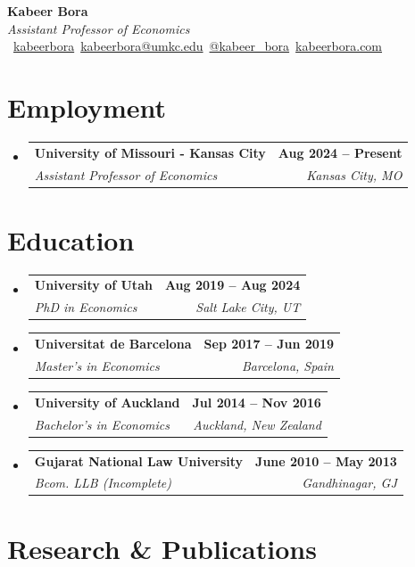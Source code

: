 \documentclass[letterpaper,11pt]{article}
\makeatletter
\newcommand{\resumeSubheading}[4]{
  \vspace{-1pt}\item
    \begin{tabular*}{1.0\textwidth}[t]{l@{\extracolsep{\fill}}r}
      \textbf{\color{primarycolor}#1} & \textbf{\small\color{accentcolor}#2} \\
      \textit{\small\color{textgray}#3} & \textit{\small\color{lightgray}#4} \\
    \end{tabular*}\vspace{-5pt}
}
\newcommand{\resumeSubHeadingListStart}{\begin{itemize}[leftmargin=0.0in, label={}]}
\newcommand{\resumeSubHeadingListEnd}{\end{itemize}}
\newcommand{\email}{\textcolor{accentcolor}{\faEnvelope}\ \href{mailto:kabeerbora@umkc.edu}{\color{textgray}kabeerbora@umkc.edu}}
\newcommand{\github}{\textcolor{accentcolor}{\faGithub}\ \href{https://github.com/kabeerbora}{\color{textgray}kabeerbora}}
\newcommand{\twitter}{\textcolor{accentcolor}{\faTwitter}\ \href{https://twitter.com/kabeer_bora}{\color{textgray}@kabeer\_bora}}
\newcommand{\website}{\textcolor{accentcolor}{\faGlobe}\ \href{https://kabeerbora.com/}{\color{textgray}kabeerbora.com}}
\makeatother
\begin{document}
\begin{center}
    {\Huge\color{primarycolor}\textbf{Kabeer Bora}} \\[8pt]
    {\large\color{accentcolor}\textit{Assistant Professor of Economics}} \\[12pt]
    \small
    \github \quad \email \quad \twitter \quad \website
    \vspace{-5pt}
\end{center}

\section{Employment}
\resumeSubHeadingListStart
  \resumeSubheading
    {University of Missouri - Kansas City}{Aug 2024 -- Present}
    {Assistant Professor of Economics}{Kansas City, MO}
\resumeSubHeadingListEnd

\section{Education}
\resumeSubHeadingListStart
  \resumeSubheading
    {University of Utah}{Aug 2019 -- Aug 2024}
    {PhD in Economics}{Salt Lake City, UT}
  \resumeSubheading
    {Universitat de Barcelona}{Sep 2017 -- Jun 2019}
    {Master's in Economics}{Barcelona, Spain}
  \resumeSubheading
    {University of Auckland}{Jul 2014 -- Nov 2016}
    {Bachelor's in Economics}{Auckland, New Zealand}
  \resumeSubheading
    {Gujarat National Law University}{June 2010 -- May 2013}
    {Bcom. LLB (Incomplete)}{Gandhinagar, GJ}
\resumeSubHeadingListEnd

\section{Research \& Publications}
\end{document}
